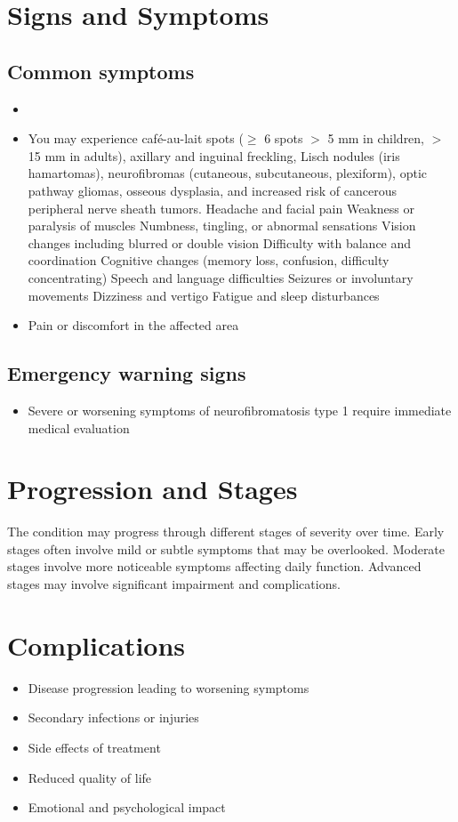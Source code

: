 \section{Signs and Symptoms}
\subsection{Common symptoms}
\begin{itemize}[noitemsep]
  \item \item You may experience caf\'{e}-au-lait spots ($\ge$ 6 spots $>$ 5 mm in children, $>$ 15 mm in adults), axillary and inguinal freckling, Lisch nodules (iris hamartomas), neurofibromas (cutaneous, subcutaneous, plexiform), optic pathway gliomas, osseous dysplasia, and increased risk of cancerous peripheral nerve sheath tumors. Headache and facial pain Weakness or paralysis of muscles Numbness, tingling, or abnormal sensations Vision changes including blurred or double vision Difficulty with balance and coordination Cognitive changes (memory loss, confusion, difficulty concentrating) Speech and language difficulties Seizures or involuntary movements Dizziness and vertigo Fatigue and sleep disturbances
  \item Pain or discomfort in the affected area
  \end{itemize}
\subsection{Emergency warning signs}
\begin{itemize}[noitemsep]
  \item Severe or worsening symptoms of neurofibromatosis type 1 require immediate medical evaluation
\end{itemize}
\section{Progression and Stages}
The condition may progress through different stages of severity over time. Early stages often involve mild or subtle symptoms that may be overlooked. Moderate stages involve more noticeable symptoms affecting daily function. Advanced stages may involve significant impairment and complications.
\section{Complications}
\begin{itemize}[noitemsep]
  \item Disease progression leading to worsening symptoms
  \item Secondary infections or injuries
  \item Side effects of treatment
  \item Reduced quality of life
  \item Emotional and psychological impact
\end{itemize}
